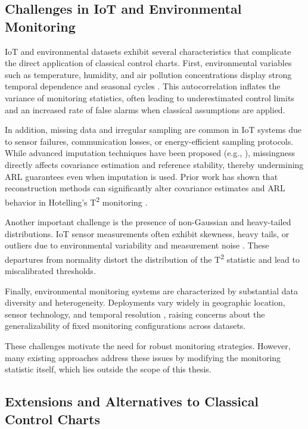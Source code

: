 \subsection{Challenges in IoT and Environmental Monitoring}

IoT and environmental datasets exhibit several characteristics that complicate the direct application of classical control charts. 
First, environmental variables such as temperature, humidity, and air pollution concentrations display strong temporal dependence and seasonal cycles \cite{Wilks2011}. 
This autocorrelation inflates the variance of monitoring statistics, often leading to underestimated control limits and an increased rate of false alarms when classical assumptions are applied.

In addition, missing data and irregular sampling are common in \ac{IoT} systems due to sensor failures, communication losses, or energy-efficient sampling protocols. 
While advanced imputation techniques have been proposed (e.g., \cite{Yoon2019}), missingness directly affects covariance estimation and reference stability, thereby undermining \ac{ARL} guarantees even when imputation is used. 
Prior work has shown that reconstruction methods can significantly alter covariance estimates and \ac{ARL} behavior in Hotelling’s T\textsuperscript{2} monitoring \cite{Wilson2025}.

Another important challenge is the presence of non-Gaussian and heavy-tailed distributions. 
IoT sensor measurements often exhibit skewness, heavy tails, or outliers due to environmental variability and measurement noise \cite{Chandola2009}. 
These departures from normality distort the distribution of the T\textsuperscript{2} statistic and lead to miscalibrated thresholds.

Finally, environmental monitoring systems are characterized by substantial data diversity and heterogeneity. 
Deployments vary widely in geographic location, sensor technology, and temporal resolution \cite{Ben2024}, raising concerns about the generalizability of fixed monitoring configurations across datasets.

These challenges motivate the need for robust monitoring strategies. 
However, many existing approaches address these issues by modifying the monitoring statistic itself, which lies outside the scope of this thesis.


\subsection{Extensions and Alternatives to Classical Control Charts}

